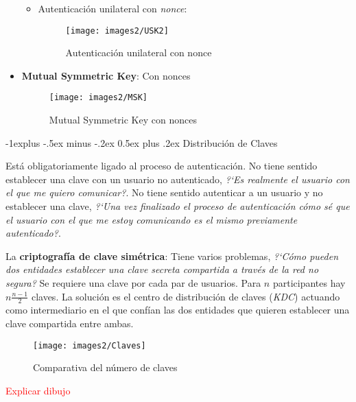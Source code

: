 \documentclass[10pt,portrait, twocolumn]{article}
\makeatletter
\renewcommand{\subsection}{\@startsection{subsection}{2}{0mm}%
                                {-1explus -.5ex minus -.2ex}%
                                {0.5ex plus .2ex}%
                                {\normalfont\normalsize\bfseries}}
\makeatother
\begin{document}
\begin{itemize}
\begin{itemize}
				\item Autenticación unilateral con \textit{nonce}:
					
					\begin{figure}[ht!]
					\centering
					\texttt{[image: images2/USK2]}
					\caption{Autenticación unilateral con nonce}
					\label{figure:Planta1}
					\end{figure}
			\end{itemize}
			
			\item \textbf{Mutual Symmetric Key}: Con nonces
			
				\begin{figure}[ht!]
				\centering
				\texttt{[image: images2/MSK]}
				\caption{Mutual Symmetric Key con nonces}
				\label{figure:Planta1}
				\end{figure}
	\end{itemize}
	
	\subsection{Distribución de Claves}

Está obligatoriamente ligado al proceso de autenticación. No tiene sentido establecer una clave con un usuario no autenticado, \textit{?`Es realmente el usuario con el que me quiero comunicar?}. No tiene sentido autenticar a un usuario y no establecer una clave, \textit{?`Una vez finalizado el proceso de autenticación cómo sé que el usuario con el que me estoy comunicando es el mismo previamente autenticado?}.

\quad La \textbf{criptografía de clave simétrica}: Tiene varios problemas, \textit{?`Cómo pueden dos entidades establecer una clave secreta compartida a través de la red no segura?} Se requiere una clave por cada par de usuarios. Para $n$ participantes hay $n \frac{n-1}{2}$ claves. La solución es el centro de distribución de claves (\textit{KDC}) actuando como intermediario en el que confían las dos entidades que quieren establecer una clave compartida entre ambas.\\

	\begin{figure}[ht!]
		\centering
		\texttt{[image: images2/Claves]}
		\caption{Comparativa del número de claves}
		\label{figure:Planta1}
		\end{figure}

\textcolor{red}{Explicar dibujo}
\end{document}
